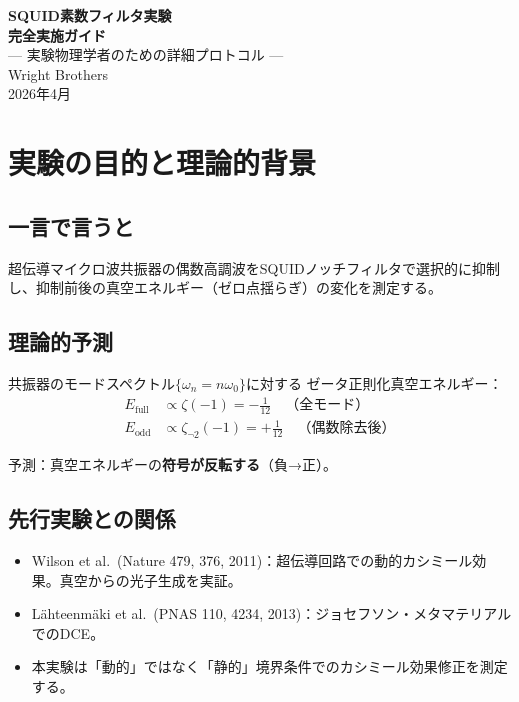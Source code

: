 \documentclass[12pt,a4paper]{article}
\begin{document}
\begin{center}
{\LARGE\bfseries SQUID素数フィルタ実験}\\[0.3cm]
{\LARGE\bfseries 完全実施ガイド}\\[0.5cm]
{\large --- 実験物理学者のための詳細プロトコル ---}\\[1.5cm]
{\large Wright Brothers}\\[0.3cm]
{2026年4月}
\end{center}

\vspace{0.5cm}
\tableofcontents
\newpage

\section{実験の目的と理論的背景}

\subsection{一言で言うと}

超伝導マイクロ波共振器の偶数高調波をSQUIDノッチフィルタで選択的に抑制し、抑制前後の真空エネルギー（ゼロ点揺らぎ）の変化を測定する。

\subsection{理論的予測}

共振器のモードスペクトル$\{\omega_n = n\omega_0\}$に対する
ゼータ正則化真空エネルギー：
\begin{align}
  E_{\mathrm{full}} &\propto \zeta(-1) = -\frac{1}{12} \quad \text{（全モード）} \\
  E_{\mathrm{odd}} &\propto \zeta_{\neg 2}(-1) = +\frac{1}{12} \quad \text{（偶数除去後）}
\end{align}

予測：真空エネルギーの\textbf{符号が反転する}（負→正）。

\subsection{先行実験との関係}

\begin{itemize}
\item Wilson et al.\ (Nature 479, 376, 2011)：超伝導回路での動的カシミール効果。真空からの光子生成を実証。
\item Lähteenmäki et al.\ (PNAS 110, 4234, 2013)：ジョセフソン・メタマテリアルでのDCE。
\item 本実験は「動的」ではなく「静的」境界条件でのカシミール効果修正を測定する。
\end{itemize}
\end{document}
